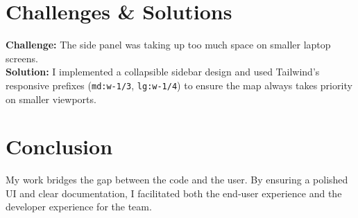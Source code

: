 \documentclass[12pt, a4paper]{article}
\begin{document}
\section{Challenges \& Solutions}
\textbf{Challenge:} The side panel was taking up too much space on smaller laptop screens.\\
\textbf{Solution:} I implemented a collapsible sidebar design and used Tailwind's responsive prefixes (\texttt{md:w-1/3}, \texttt{lg:w-1/4}) to ensure the map always takes priority on smaller viewports.

\section{Conclusion}
My work bridges the gap between the code and the user. By ensuring a polished UI and clear documentation, I facilitated both the end-user experience and the developer experience for the team.
\end{document}
